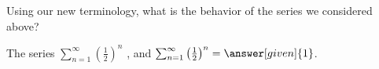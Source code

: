 \documentclass{ximera}
\begin{document}
\begin{question}
  Using our new terminology, what is the behavior of the series we 
  considered above?
  \begin{prompt}
    The series $\sum_{n=1}^\infty \left(\frac{1}{2}\right)^n$
    , and
      $\sum_{n=1}^\infty \left(\frac{1}{2}\right)^n = \answer[given]{1}$.
  \end{prompt}
\end{question}
%
%
%



\end{document}
